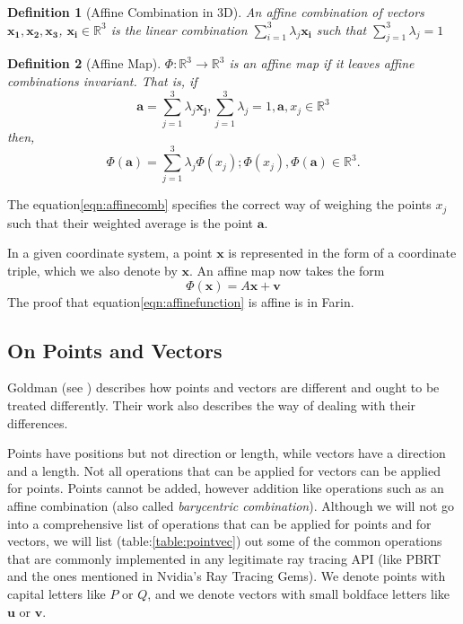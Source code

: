 \documentclass[a4paper, 12pt]{article}
\newtheorem{definition}{Definition}
\begin{document}
\begin{definition}[Affine Combination in 3D]
	An affine combination of vectors $\bm{x_{1}}, \bm{x_{2}}, \bm{x_{3}}$, 
	$\bm{x_{i}}\in \mathbb{R}^{3}$
	is the linear combination $\sum_{i=1}^{3}\lambda_{j}\bm{x_{i}}$ such that
	$\sum_{j=1}^{3}\lambda_{j}=1$
\end{definition}

\begin{definition}[Affine Map]
	$\Phi:\mathbb{R}^{3}\to \mathbb{R}^{3}$ is an affine map if it leaves affine combinations
	invariant. That is, if
	$$
		\bm{a} = \sum_{j=1}^{3}\lambda_{j}\bm{x_{j}}, \sum_{j=1}^{3}\lambda_{j}=1, \bm{a}, x_{j}\in \mathbb{R}^{3}
	$$
	then, 
	\begin{equation}\label{eqn:affinecomb}
		\Phi(\bm{a}) = \sum_{j=1}^{3}\lambda_{j}\Phi(x_{j}); \Phi(x_{j}), \Phi(\bm{a}) \in \mathbb{R}^{3}.
	\end{equation}
\end{definition}

The  equation\eqref{eqn:affinecomb} specifies the correct way of weighing the 
points $x_{j}$ such that their weighted average is the point $\bm{a}$.

In a given coordinate system, a point $\bm{x}$ is represented in the form of a coordinate triple, 
which we also denote by $\bm{x}$. An affine map now takes the form 
\begin{equation}\label{eqn:affinefunction}
\Phi(\bm{x}) = A\bm{x} + \bm{v}
\end{equation}
The proof that equation\eqref{eqn:affinefunction} is affine is in Farin\cite{farin}.

\subsection{On Points and Vectors}
Goldman (see \cite{Goldman1985IllicitEI}) describes how points and vectors 
are different and ought to be treated differently. Their work also describes 
the way of dealing with their differences.

Points have positions but not direction or length, while vectors have a direction 
and a length. Not all operations that can be applied for vectors can be applied for 
points. Points cannot be added, however addition like operations 
such as an affine combination (also called \textit{barycentric combination}). Although 
we will not go into a comprehensive list of operations that can be 
applied for points and for vectors, we will list (table:\ref{table:pointvec}) out some of the common
operations that are commonly implemented in any legitimate ray tracing API 
(like PBRT\cite{pbrt} and the ones mentioned in Nvidia's Ray Tracing Gems\cite{Haines2019}). 
We denote points with capital letters like $P$ or $Q$, and we denote vectors 
with small boldface letters like $\bm{u}$ or $\bm{v}$.
\end{document}

